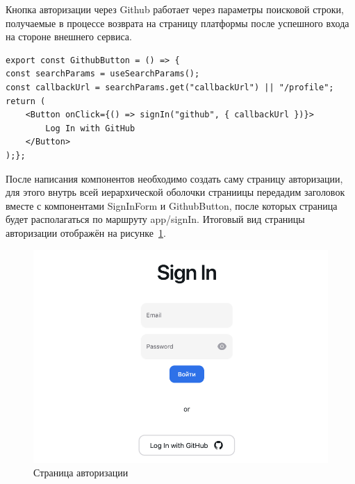 \documentclass[master, och, diploma]{SCWorks}
\begin{document}
Кнопка авторизации через Github работает через параметры поисковой строки, получаемые в процессе возврата на страницу платформы после успешного входа на стороне внешнего сервиса.
\begin{verbatim}
export const GithubButton = () => {
const searchParams = useSearchParams();
const callbackUrl = searchParams.get("callbackUrl") || "/profile";
return (
    <Button onClick={() => signIn("github", { callbackUrl })}>        
        Log In with GitHub
    </Button>
);};
\end{verbatim}

После написания компонентов необходимо создать саму страницу авторизации, для этого внутрь всей иерархической оболочки страниицы передадим заголовок вместе с компонентами SignInForm и GithubButton, после которых страница будет располагаться по маршруту app/signIn. Итоговый вид страницы авторизации отображён на рисунке~\ref{fig:27}. 
\begin{figure}[!ht]
    \centering
    \includegraphics[width=12cm]{images/image-signin.png}
    \caption{\label{fig:27}%
        Страница авторизации}
\end{figure}
\end{document}
